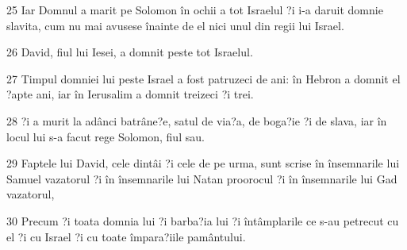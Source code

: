 \par 25 Iar Domnul a marit pe Solomon în ochii a tot Israelul ?i i-a daruit domnie slavita, cum nu mai avusese înainte de el nici unul din regii lui Israel.
\par 26 David, fiul lui Iesei, a domnit peste tot Israelul.
\par 27 Timpul domniei lui peste Israel a fost patruzeci de ani: în Hebron a domnit el ?apte ani, iar în Ierusalim a domnit treizeci ?i trei.
\par 28 ?i a murit la adânci batrâne?e, satul de via?a, de boga?ie ?i de slava, iar în locul lui s-a facut rege Solomon, fiul sau.
\par 29 Faptele lui David, cele dintâi ?i cele de pe urma, sunt scrise în însemnarile lui Samuel vazatorul ?i în însemnarile lui Natan proorocul ?i în însemnarile lui Gad vazatorul,
\par 30 Precum ?i toata domnia lui ?i barba?ia lui ?i întâmplarile ce s-au petrecut cu el ?i cu Israel ?i cu toate împara?iile pamântului.


